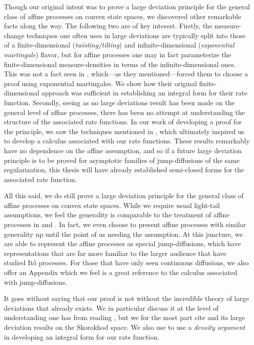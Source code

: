 Though our original intent was to prove a large deviation principle for the general class of affine processes on convex state spaces, we discovered other remarkable facts along the way.
The following two are of key interest.
Firstly, the measure-change techniques one often uses in large deviations are typically split into those of a finite-dimensional (\emph{twisting/tilting}) and infinite-dimensional (\emph{exponential martingale}) flavor, but for affine processes one may in fact parameterize the finite-dimensional measure-densities in terms of the infinite-dimensional ones.
This was not a fact seen in \cite{kang2014}, which---as they mentioned---forced them to choose a proof using exponential martingales.
We show how their original finite-dimensional approach was sufficient in establishing an integral form for their rate function.
Secondly, seeing as no large deviations result has been made on the general level of affine processes, there has been no attempt at understanding the structure of the associated rate functions.
In our work of developing a proof for the principle, we saw the techniques mentioned in \cite{duffy2004}, which ultimately inspired us to develop a calculus associated with our rate functions.
These results remarkably have no dependence on the affine assumption, and so if a future large deviation principle is to be proved for asymptotic families of jump-diffusions of the same regularization, this thesis will have already established semi-closed forms for the associated rate function.

All this said, we do still prove a large deviation principle for the general class of affine processes on convex state spaces.
While we require usual light-tail assumptions, we feel the generality is comparable to the treatment of affine processes in \cite{cuchiero2011} and \cite{keller2015}.
In fact, we even choose to present affine processes with similar generality up until the point of us needing the assumption.
At this juncture, we are able to represent the affine processes as special jump-diffusions, which have representations that are far more familiar to the larger audience that have studied It\^o processes.
For those that have only seen continuous diffusions, we also offer an Appendix which we feel is a great reference to the calculus associated with jump-diffusions.

It goes without saying that our proof is not without the incredible theory of large deviations that already exists.
We in particular discuss it at the level of understanding one has from reading \cite{dembo2010}, but we for the most part cite \cite{feng2006} and its large deviation results on the Skorokhod space.
We also use \cite{puhalskii2001} to use a \emph{density argument} in developing an integral form for our rate function.
